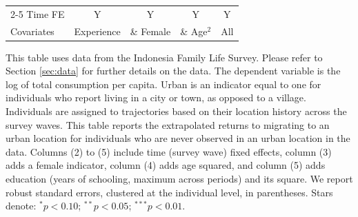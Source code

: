 \begin{table}[htbp]
\begin{threeparttable}
\begin{tabular}{l cccc}
\cmidrule{2-5} Time FE & Y & Y & Y & Y \\ Covariates & Experience & \& Female & \& Age$^2$ & All \\ \bottomrule \end{tabular} \begin{tablenotes}[flushleft] \footnotesize \item{This table uses data from the Indonesia Family Life Survey. Please refer to Section \ref{sec:data} for further details on the data. The dependent variable is the log of total consumption per capita. Urban is an indicator equal to one for individuals who report living in a city or town, as opposed to a village. Individuals are assigned to trajectories based on their location history across the survey waves. This table reports the extrapolated returns to migrating to an urban location for individuals who are never observed in an urban location in the data. Columns (2) to (5) include time (survey wave) fixed effects, column (3) adds a female indicator, column (4) adds age squared, and column (5) adds education (years of schooling, maximum across periods) and its square. We report robust standard errors, clustered at the individual level, in parentheses. Stars denote: $^{*} p<0.10$; $^{**} p<0.05$; $^{***} p<0.01$.} \end{tablenotes} \end{threeparttable} \end{table}
